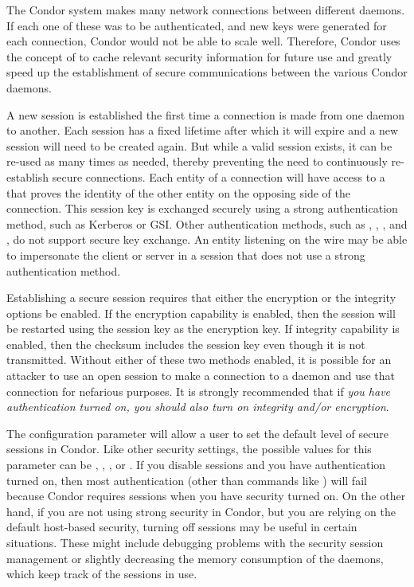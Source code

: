 The Condor system makes many network connections between different
daemons.  
If each one of these was to be authenticated,
and new keys were generated for each connection,
Condor would not be able to scale well.  
Therefore, Condor uses the concept of  to cache
relevant security information for future use and greatly speed up the
establishment of secure communications between the various Condor
daemons.

A new session is established the first time a connection is made from one daemon to another.
Each session has a fixed lifetime after which it will expire and
a new session will need to be created again.
But while a valid session exists, it can be re-used as many times as
needed, thereby preventing the need to continuously re-establish secure connections.
Each entity of a connection will have access to a  that proves the
identity of the other entity on the opposing side of the connection.
This session key is exchanged securely using
a strong authentication method, such as Kerberos or GSI.
Other authentication methods, such as ,
,  , and
, do not support secure key exchange.
An entity
listening on the wire may be able to impersonate the client or server
in a session that does not use a strong authentication method.

Establishing a secure session requires that either the encryption or the integrity options be enabled.
If the encryption capability is enabled, then the session will be restarted using the session key
as the encryption key.
If integrity capability is enabled, then the checksum includes the session key even
though it is not transmitted.
Without either of these two methods enabled,
it is possible for an
attacker to use an open session to make a connection to a daemon and
use that connection for nefarious purposes.
It is strongly recommended that if \emph{you have authentication turned
on, you should also turn on integrity and/or encryption}.

The configuration parameter  will allow
a user to set the default level of secure sessions in Condor.
Like other security settings, the possible values for this parameter can be
\verb@REQUIRED@, \verb@PREFERRED@, \verb@OPTIONAL@,
or \verb@NEVER@.
If you disable sessions and you have authentication turned
on, then most authentication (other than commands like
) will fail because Condor requires sessions when you
have security turned on. 
On the other hand, if you are not using strong security in Condor, but
you are relying on the default host-based security, turning off
sessions may be useful in certain situations. These might include debugging problems
with the security session management or slightly decreasing the memory
consumption of the daemons, which keep track of the sessions in use. 

